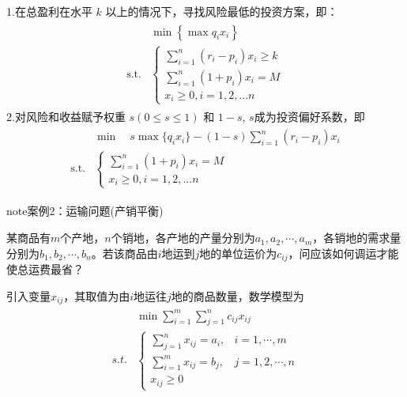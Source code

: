 \documentclass[letterpaper,10pt,english]{sphinxmanual}
\begin{document}
1.在总盈利在水平 \(k\) 以上的情况下，寻找风险最低的投资方案，即：
\begin{equation*}
\begin{split}
\begin{aligned}
&{\min \left\{ \max {q_i x_i} \right\}}\\
\text{s.t.} & {\left\{ \begin{array}{l}
{\displaystyle\sum_{i=1}^n (r_i - p_i) x_i \geq k}\\
{ \displaystyle\sum_{i=1}^n (1+p_i)x_i = M}\\
{ x_i \geq 0, i=1,2,...n}
\end{array} \right.}
\end{aligned}
\end{split}
\end{equation*}
2.对风险和收益赋予权重 \(s(0 \leq s \leq 1)\) 和 \(1-s\), \(s\)成为投资偏好系数，即
\begin{equation*}
\begin{split}
\begin{aligned}
& {\min \quad s\max \{q_ix_i\} - (1-s)\sum_{i=1}^n (r_i - p_i) x_i } \\
\text{s.t.}&\left\{\begin{array}{l}
{\displaystyle \sum_{i=1}^n (1+p_i)x_i = M }\\
{  x_i \geq 0, i=1,2,...n}
\end{array}\right.
\end{aligned}
\end{split}
\end{equation*}
\begin{sphinxadmonition}{note}{案例2：运输问题(产销平衡)}

某商品有\(m\)个产地，\(n\)个销地，各产地的产量分别为\(a_1,a_2,\cdots,a_m\)，各销地的需求量分别为\(b_1,b_2,\cdots,b_n\)。若该商品由\(i\)地运到\(j\)地的单位运价为\(c_{ij}\)，问应该如何调运才能使总运费最省？
\end{sphinxadmonition}

 引入变量\(x_{ij}\)，其取值为由\(i\)地运往\(j\)地的商品数量，数学模型为
\begin{equation*}
\begin{split}
\begin{aligned}
&\min \sum_{i=1}^{m} \sum_{j=1}^{n} c_{i j} x_{i j}\\
s.t.&\left\{\begin{array}{ll}
{\displaystyle \sum_{j=1}^{n} x_{i j}=a_{i},} & {i=1, \cdots, m} \\
{\displaystyle \sum_{i=1}^{m} x_{i j}=b_{j},} & {j=1,2, \cdots, n} \\
{x_{i j} \geq 0}
\end{array}\right.
\end{aligned}
\end{split}
\end{equation*}
\end{document}
